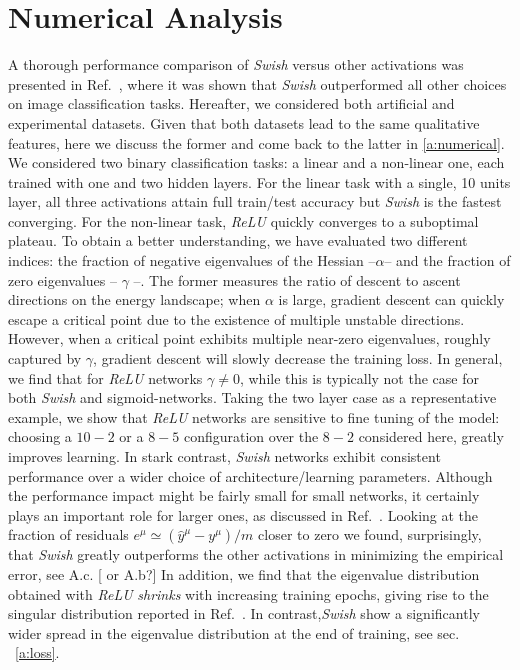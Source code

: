 \documentclass{article}
\begin{document}
\section{Numerical Analysis}\label{sec:numerical}
%
A thorough performance comparison of {\it Swish} versus other activations was presented in Ref.~\cite{prajit}, where it was shown that {\it Swish} outperformed all other choices on image classification tasks. Hereafter,  we considered both artificial and experimental datasets. Given that both datasets lead to the same qualitative features, here we discuss the former and come back to the latter in  \eqref{a:numerical}. We considered two binary classification tasks: a linear and a non-linear one, each trained with one and two hidden layers. For the linear task with a single, 10 units layer, all three activations attain full train/test accuracy but {\it Swish} is the fastest converging.  For the non-linear task, {\it ReLU} quickly converges to a suboptimal plateau. To obtain a better understanding, we have evaluated two different indices: the fraction of negative eigenvalues of the Hessian --$\alpha$-- and the fraction of zero eigenvalues -- $\gamma$ --. The former measures the ratio of descent to ascent directions on the energy landscape; when $\alpha$ is large, gradient descent can quickly escape a critical point due to the existence of multiple unstable directions. However, when a critical point exhibits multiple near-zero eigenvalues, roughly captured by $\gamma$, gradient descent will slowly decrease the training loss.
In general, we find that for {\it ReLU} networks $\gamma \neq 0$, while this is typically not the case for both {\it Swish} and sigmoid-networks. Taking the two layer case as a representative example, we show that {\it ReLU} networks are sensitive to fine tuning of the model: choosing a $10-2$ or a $8-5$ configuration over the $8-2$ considered here, greatly improves learning. In stark contrast, {\it Swish} networks exhibit consistent performance over a wider choice of architecture/learning parameters. Although the performance impact might be fairly small for small networks, it certainly plays an important role for larger ones, as discussed in Ref.~\cite{prajit}. Looking at the fraction of residuals $e^{\mu} \simeq (\hat{y}^{\mu} - y^{\mu})/m$ closer to zero we found, surprisingly, that {\it Swish} greatly outperforms the other activations in minimizing the empirical error, see A.c. [{\color{red} or A.b?}]
%
In addition, we find that the eigenvalue distribution obtained with {\it ReLU}  {\it shrinks} with increasing training epochs, giving rise to the singular distribution reported in Ref.~\cite{penn1, levent}. In contrast,{\it Swish} show a significantly wider spread in the eigenvalue distribution at the end of training, see sec. ~\eqref{a:loss}.
\end{document}
